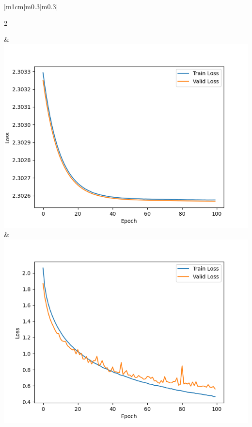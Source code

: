 \documentclass{article}%
\begin{document}
\begin{table}[H]
\begin{tabular}{|m{1cm}|m{0.3\linewidth}|m{0.3\linewidth}|}
        \begin{center} 2 \end{center}  &\vspace{5pt} \includegraphics[width=1\linewidth]{Loss_4.5.png} &\vspace{5pt} \includegraphics[width=1\linewidth]{Loss_5.png} \\[0.6cm]
        \hline
    \end{tabular}
    \caption{是否使用BatchNorm——Loss曲线}
\end{table}
\end{document}
